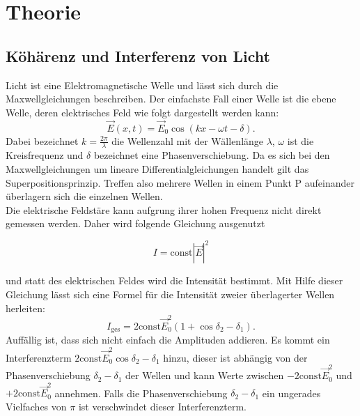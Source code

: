 \section{Theorie}
\subsection{Köhärenz und Interferenz von Licht}
Licht ist eine Elektromagnetische Welle und lässt sich durch die Maxwellgleichungen
beschreiben. Der einfachste Fall einer Welle ist die ebene Welle, deren elektrisches Feld
wie folgt dargestellt werden kann:
\begin{equation}
  \vec{E}(x,t)=\vec{E}_{0}\cos(kx-\omega t -\delta)
  \label{eqn:eben}.
\end{equation}
Dabei bezeichnet $k=\frac{2\pi}{\lambda}$ die Wellenzahl mit der Wällenlänge $\lambda$,
$\omega$ ist die Kreisfrequenz und $\delta$ bezeichnet eine Phasenverschiebung.
Da es sich bei den Maxwellgleichungen um lineare Differentialgleichungen handelt
gilt das Superpositionsprinzip. Treffen also mehrere Wellen in einem Punkt P
aufeinander überlagern sich die einzelnen Wellen.\\
Die elektrische Feldstäre kann aufgrung ihrer hohen Frequenz %
nicht direkt gemessen werden. Daher wird folgende Gleichung ausgenutzt

\begin{equation}
  I=\text{const} |\vec{E}|^{2}
  \label{eqn:intensität}
\end{equation}

und statt des elektrischen Feldes wird die Intensität bestimmt.
\label{sec:Theorie}
Mit Hilfe dieser Gleichung lässt sich eine Formel für die Intensität zweier
überlagerter Wellen herleiten:
\begin{equation}
  I_{\text{ges}}=2\text{const}\vec{E}_{0}^{2}(1+\cos{\delta_{2}-\delta_{1}})
  \label{eqn:iges}.
\end{equation}
Auffällig ist, dass sich nicht einfach die Amplituden addieren. Es kommt ein Interferenzterm
$2\text{const}\vec{E}_{0}^{2}\cos{\delta_{2}-\delta_{1}}$ hinzu, dieser ist abhängig von
der Phasenverschiebung $\delta_{2}-\delta_{1}$ der Wellen und kann Werte zwischen
$-2\text{const}\vec{E}_{0}^{2}$ und $+2\text{const}\vec{E}_{0}^{2}$ annehmen.
Falls die Phasenverschiebung $\delta_{2}-\delta_{1}$ ein ungerades Vielfaches von
$\pi$ ist verschwindet dieser Interferenzterm.\\

